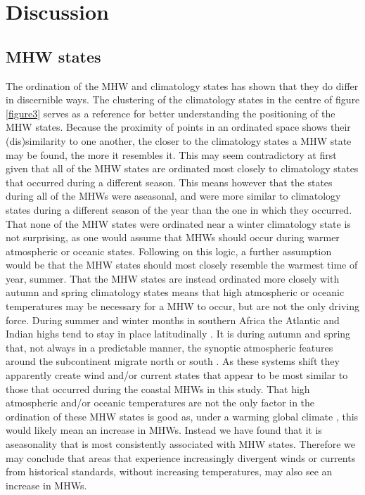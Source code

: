 \documentclass[utf8]{frontiersSCNS}
\begin{document}
\section{Discussion}
\subsection{MHW states}
The ordination of the MHW and climatology states has shown that they do differ in discernible ways. The clustering of the climatology states in the centre of figure \ref{figure3} serves as a reference for better understanding the positioning of the MHW states. Because the proximity of points in an ordinated space shows their (dis)similarity to one another, the closer to the climatology states a MHW state may be found, the more it resembles it. This may seem contradictory at first given that all of the MHW states are ordinated most closely to climatology states that occurred during a different season. This means however that the states during all of the MHWs were aseasonal, and were more similar to climatology states during a different season of the year than the one in which they occurred. That none of the MHW states were ordinated near a winter climatology state is not surprising, as one would assume that MHWs should occur during warmer atmospheric or oceanic states. Following on this logic, a further assumption would be that the MHW states should most closely resemble the warmest time of year, summer. That the MHW states are instead ordinated more closely with autumn and spring climatology states means that high atmospheric or oceanic temperatures may be necessary for a MHW to occur, but are not the only driving force. During summer and winter months in southern Africa the Atlantic and Indian highs tend to stay in place latitudinally \citep{vanHeerden1998}. It is during autumn and spring that, not always in a predictable manner, the synoptic atmospheric features around the subcontinent migrate north or south \citep{vanHeerden1998}. As these systems shift they apparently create wind and/or current states that appear to be most similar to those that occurred during the coastal MHWs in this study. That high atmospheric and/or oceanic temperatures are not the only factor in the ordination of these MHW states is good as, under a warming global climate \citep{Pachauri2014}, this would likely mean an increase in MHWs. Instead we have found that it is aseasonality that is most consistently associated with MHW states. Therefore we may conclude that areas that experience increasingly divergent winds or currents from historical standards, without increasing temperatures, may also see an increase in MHWs.
\end{document}
